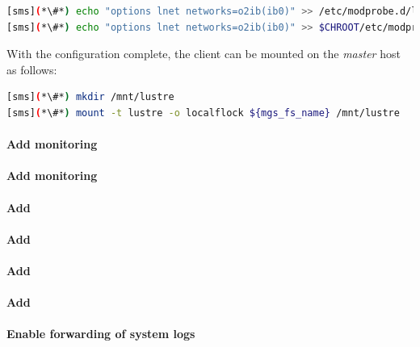 \documentclass[letterpaper]{article}
\begin{document}
\begin{lstlisting}[language=bash,keywords={},upquote=true]
[sms](*\#*) echo "options lnet networks=o2ib(ib0)" >> /etc/modprobe.d/lustre.conf
[sms](*\#*) echo "options lnet networks=o2ib(ib0)" >> $CHROOT/etc/modprobe.d/lustre.conf
\end{lstlisting}

With the \Lustre{} configuration complete, the client can be mounted on the {\em master}
host as follows:
\begin{lstlisting}[language=bash,keywords={},upquote=true]
[sms](*\#*) mkdir /mnt/lustre
[sms](*\#*) mount -t lustre -o localflock ${mgs_fs_name} /mnt/lustre
\end{lstlisting}


\paragraph{Add \Nagios{} monitoring}


\clearpage
\paragraph{Add \Ganglia{} monitoring}


\paragraph{Add \clustershell{}}


\paragraph{Add \mrsh{}}


\paragraph{Add \genders{}}


\paragraph{Add \powerman{}}


\paragraph{Enable forwarding of system logs} \label{sec:add_syslog}

\end{document}

